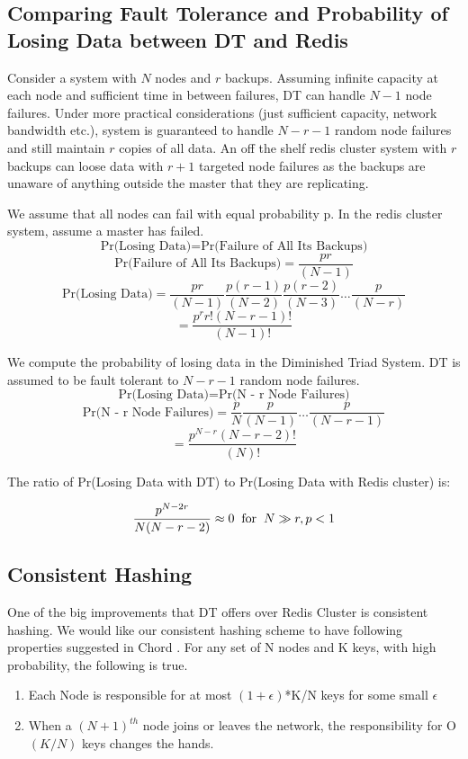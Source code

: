 \documentclass[10pt,twocolumn,letterpaper]{article}
\begin{document}
\subsection{Comparing Fault Tolerance and Probability of Losing Data between DT and Redis}
Consider a system with \(N\) nodes and \(r\) backups. Assuming infinite capacity at each node and sufficient time in between failures, DT can handle \(N-1\) node failures. Under more practical considerations (just sufficient capacity, network bandwidth etc.), system is guaranteed to handle \(N - r - 1\) random node failures and still maintain \(r\) copies of all data.
An off the shelf redis cluster system with \(r\) backups can loose data with \(r + 1\) targeted node failures as the backups are unaware of anything outside the master that they are replicating.

We assume that all nodes can fail with equal probability p. In the redis cluster system, assume a master has failed. 
$$\textrm{Pr(Losing Data)}= \textrm{Pr(Failure of All Its Backups)}$$
$$\textrm{Pr(Failure of All Its Backups)} = \frac{pr }{(N - 1)}$$
$$\textrm{Pr(Losing Data)} =\frac{pr}{(N-1)} \frac{p(r-1)}{(N-2)}  \frac{p(r-2)}{(N-3)}  \dots  \frac{p}{(N-r)}$$
$$=\frac{p^{r}r!(N-r-1)!}{(N-1)!}$$

We compute the probability of losing data in the Diminished Triad System. DT is assumed to be fault tolerant to $N - r - 1$ random node failures.
$$\textrm{Pr(Losing Data)}= \textrm{Pr(N - r  Node Failures)}$$
$$\textrm{Pr(N - r  Node Failures)} = \frac{p}{N} \frac{p}{(N-1)} \dots \frac{p}{(N-r-1)}$$
$$=\frac{p^{N-r}(N-r-2)!}{(N)!}$$

The ratio of Pr(Losing Data with DT) to Pr(Losing Data with Redis cluster) is:

$$\frac{p^{N - 2r}}{N(N-r-2)} \approx 0 \hskip 2mm \textrm{for} \hskip 2mm N \gg r, p < 1$$

\subsection{Consistent Hashing}
One of the big improvements that DT offers over Redis Cluster is consistent hashing. We would like our consistent hashing scheme to have following properties suggested in Chord \cite{chord}.
For any set of N nodes and K keys, with high probability, the following is true.
\begin{enumerate}
\item Each Node is responsible for at most \((1+ \epsilon )\)*K/N keys for some small  \( \epsilon  \)
\item When a \((N+1)^{th}\) node joins or leaves the network, the responsibility for O\((K/N)\) keys changes the hands. 
\end{enumerate}
\end{document}
